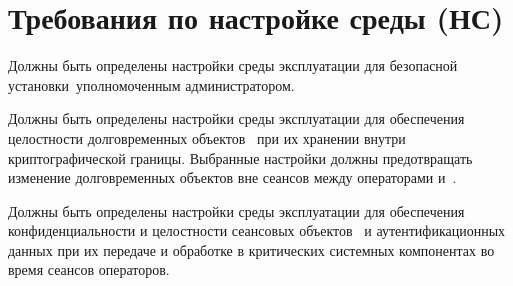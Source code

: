 \section{Требования по настройке среды (НС)}

\label{ENVInstall}
Должны быть определены настройки среды эксплуатации
для безопасной установки~\TOE уполномоченным администратором.

\label{ENVObjects}
Должны быть определены настройки среды эксплуатации
для обеспечения целостности долговременных объектов~ 
при их хранении внутри криптографической границы. 
Выбранные настройки должны предотвращать 
изменение долговременных объектов вне сеансов между операторами и~\TOE.

\label{ENVSession}
Должны быть определены настройки среды эксплуатации
для обеспечения конфиденциальности и целостности 
сеансовых объектов~  
и аутентификационных данных при их передаче и обработке 
в критических системных компонентах во время сеансов операторов.


